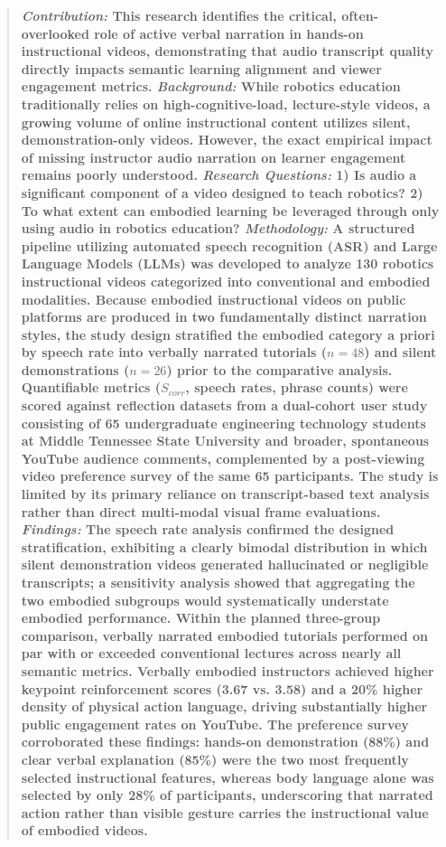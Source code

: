 \begin{abstract}
\textbf{\textit{Contribution:} This research identifies the critical, often-overlooked role of active verbal narration in hands-on instructional videos, demonstrating that audio transcript quality directly impacts semantic learning alignment and viewer engagement metrics. \textit{Background:} While robotics education traditionally relies on high-cognitive-load, lecture-style videos, a growing volume of online instructional content utilizes silent, demonstration-only videos. However, the exact empirical impact of missing instructor audio narration on learner engagement remains poorly understood. \textit{Research Questions:} 1) Is audio a significant component of a video designed to teach robotics? 2) To what extent can embodied learning be leveraged through only using audio in robotics education? \textit{Methodology:} A structured pipeline utilizing automated speech recognition (ASR) and Large Language Models (LLMs) was developed to analyze 130 robotics instructional videos categorized into conventional and embodied modalities. Because embodied instructional videos on public platforms are produced in two fundamentally distinct narration styles, the study design stratified the embodied category a priori by speech rate into verbally narrated tutorials ($n=48$) and silent demonstrations ($n=26$) prior to the comparative analysis. Quantifiable metrics ($S_{corr}$, speech rates, phrase counts) were scored against reflection datasets from a dual-cohort user study consisting of 65 undergraduate engineering technology students at Middle Tennessee State University and broader, spontaneous YouTube audience comments, complemented by a post-viewing video preference survey of the same 65 participants. The study is limited by its primary reliance on transcript-based text analysis rather than direct multi-modal visual frame evaluations. \textit{Findings:} The speech rate analysis confirmed the designed stratification, exhibiting a clearly bimodal distribution in which silent demonstration videos generated hallucinated or negligible transcripts; a sensitivity analysis showed that aggregating the two embodied subgroups would systematically understate embodied performance. Within the planned three-group comparison, verbally narrated embodied tutorials performed on par with or exceeded conventional lectures across nearly all semantic metrics. Verbally embodied instructors achieved higher keypoint reinforcement scores (3.67 vs. 3.58) and a 20\% higher density of physical action language, driving substantially higher public engagement rates on YouTube. The preference survey corroborated these findings: hands-on demonstration (88\%) and clear verbal explanation (85\%) were the two most frequently selected instructional features, whereas body language alone was selected by only 28\% of participants, underscoring that narrated action rather than visible gesture carries the instructional value of embodied videos.}
\end{abstract}